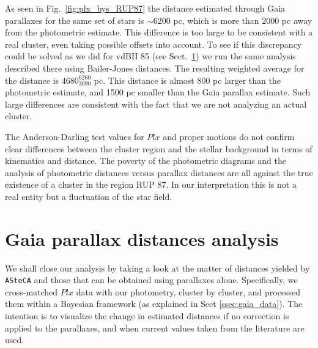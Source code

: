 \documentclass[draft]{aa}
\begin{document}
As seen in Fig.~\ref{fig:plx_bys_RUP87} the distance estimated through
Gaia parallaxes for the same set of stars is $\sim6200$ pc, which is more
than 2000 pc away from the photometric estimate. This difference is too large to
be consistent with a real cluster, even taking possible offsets into account.
To see if this discrepancy could be solved as we did for vdBH 85 (see
Sect.~\ref{sec:gaia_distances}) we run the same analysis described there using
Bailer-Jones distances. The resulting weighted average for the
distance is $4680_{3090}^{6260}$ pc. This distance is almost 800 pc larger
than the photometric estimate, and 1500 pc smaller than the Gaia parallax
estimate. Such large differences are consistent with the fact that we are not
analyzing an actual cluster.

The Anderson-Darling test values for $Plx$ and proper motions do not confirm
clear differences between the cluster region and the stellar background in
terms of kinematics and distance. The poverty of the photometric diagrams and
the analysis of photometric distances versus parallax distances
are all against the true existence of a cluster in the region RUP 87.
In our interpretation this is not a real entity but a fluctuation of the star
field.





\section{Gaia parallax distances analysis}
\label{sec:gaia_distances}




We shall close our analysis by taking a look at the matter of distances yielded
by \texttt{ASteCA} and those that can be obtained using parallaxes alone.
Specifically, we cross-matched $Plx$ data with our photometry, cluster by
cluster, and processed them within a Bayesian framework (as explained in Sect
\ref{ssec:gaia_data}). The intention is to visualize the change in estimated
distances if no correction is applied to the parallaxes, and when current
values taken from the literature are used.\\
\end{document}
